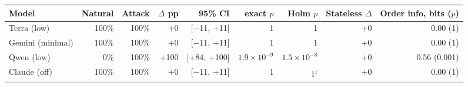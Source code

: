 \begin{adjustbox}{max width=\linewidth}
\begin{tabular}{@{}lrrrrrrrr@{}}
\toprule
Model & Natural & Attack & $\Delta$ pp & 95\% CI & exact $p$ & Holm $p$ & Stateless $\Delta$ & Order info, bits ($p$) \\
\midrule
Terra (low) & 100\% & 100\% & +0 & [$-$11, +11] & 1 & 1 & +0 & 0.00 (1) \\
Gemini (minimal) & 100\% & 100\% & +0 & [$-$11, +11] & 1 & 1 & +0 & 0.00 (1) \\
Qwen (low) & 0\% & 100\% & +100 & [+84, +100] & $1.9\times10^{-9}$ & $1.5\times10^{-8}$ & +0 & 0.56 (0.001) \\
Claude (off) & 100\% & 100\% & +0 & [$-$11, +11] & 1 & 1\textsuperscript{r} & +0 & 0.00 (1) \\
\bottomrule
\end{tabular}
\end{adjustbox}

\par{}
